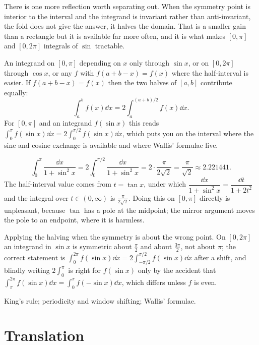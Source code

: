 There is one more reflection worth separating out. When the symmetry point is interior to the interval and the integrand is invariant rather than anti-invariant, the fold does not give the answer, it halves the domain. That is a smaller gain than a rectangle but it is available far more often, and it is what makes $[0,\pi]$ and $[0,2\pi]$ integrals of $\sin$ tractable.

\cue An integrand on $[0,\pi]$ depending on $x$ only through $\sin x$, or on $[0,2\pi]$ through $\cos x$, or any $f$ with $f(a+b-x)=f(x)$ where the half-interval is easier.
\method If $f(a+b-x)=f(x)$ then the two halves of $[a,b]$ contribute equally:
\[\int_a^bf(x)\dd x=2\int_a^{(a+b)/2}f(x)\dd x.\]
For $[0,\pi]$ and an integrand $f(\sin x)$ this reads $\int_0^{\pi}f(\sin x)\dd x=2\int_0^{\pi/2}f(\sin x)\dd x$, which puts you on the interval where the sine and cosine exchange is available and where Wallis' formulae live.

\begin{worked}
\[\int_0^{\pi}\frac{\dd x}{1+\sin^{2}x}=2\int_0^{\pi/2}\frac{\dd x}{1+\sin^{2}x}=2\cdot\frac{\pi}{2\sqrt2}=\frac{\pi}{\sqrt2}\approx2.221441.\]
The half-interval value comes from $t=\tan x$, under which $\dfrac{\dd x}{1+\sin^{2}x}=\dfrac{\dd t}{1+2t^{2}}$ and the integral over $t\in(0,\infty)$ is $\tfrac{\pi}{2\sqrt2}$. Doing this on $[0,\pi]$ directly is unpleasant, because $\tan$ has a pole at the midpoint; the mirror argument moves the pole to an endpoint, where it is harmless.
\end{worked}

\begin{trap}
Applying the halving when the symmetry is about the wrong point. On $[0,2\pi]$ an integrand in $\sin x$ is symmetric about $\tfrac{\pi}{2}$ and about $\tfrac{3\pi}{2}$, not about $\pi$; the correct statement is $\int_0^{2\pi}f(\sin x)\dd x=2\int_{-\pi/2}^{\pi/2}f(\sin x)\dd x$ after a shift, and blindly writing $2\int_0^{\pi}$ is right for $f(\sin x)$ only by the accident that $\int_{\pi}^{2\pi}f(\sin x)\dd x=\int_0^{\pi}f(-\sin x)\dd x$, which differs unless $f$ is even.
\end{trap}

\begin{seealsob}King's rule; periodicity and window shifting; Wallis' formulae.\end{seealsob}

\section{Translation}

